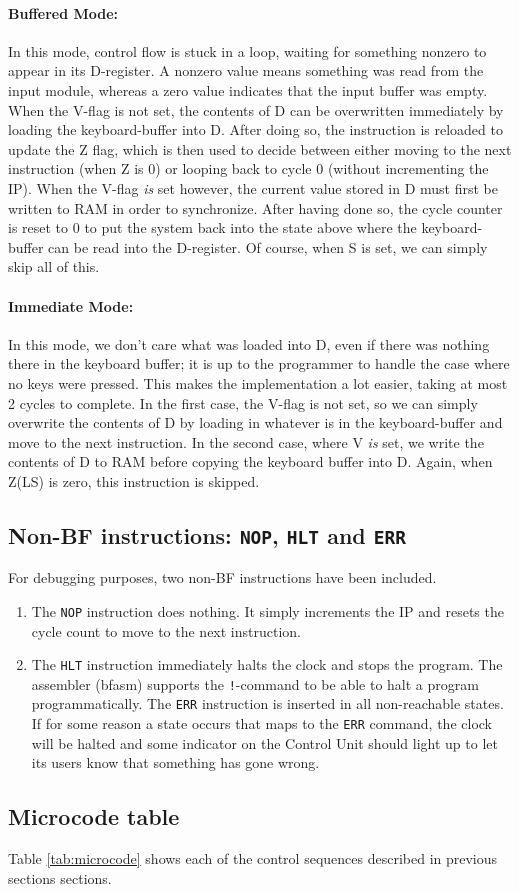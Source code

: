 \paragraph{Buffered Mode:}
In this mode, control flow is stuck in a loop, waiting for something nonzero to appear in its D-register. A nonzero value means something was read from the input module, whereas a zero value indicates that the input buffer was empty. When the V-flag is not set, the contents of D can be overwritten immediately by loading the keyboard-buffer into D. After doing so, the instruction is reloaded to update the Z flag, which is then used to decide between either moving to the next instruction (when Z is 0) or looping back to cycle 0 (without incrementing the IP). When the V-flag \emph{is} set however, the current value stored in D must first be written to RAM in order to synchronize.  After having done so, the cycle counter is reset to 0 to put the system back into the state above where the keyboard-buffer can be read into the D-register. Of course, when S is set, we can simply skip all of this.

\paragraph{Immediate Mode:}
In this mode, we don't care what was loaded into D, even if there was nothing there in the keyboard buffer; it is up to the programmer to handle the case where no keys were pressed. This makes the implementation a lot easier, taking at most 2 cycles to complete. In the first case, the V-flag is not set, so we can simply overwrite the contents of D by loading in whatever is in the keyboard-buffer and move to the next instruction. In the second case, where V \emph{is} set, we write the contents of D to RAM before copying the keyboard buffer into D. Again, when Z(LS) is zero, this instruction is skipped.
  
\subsection{Non-BF instructions: \texttt{NOP}, \texttt{HLT} and \texttt{ERR}}
For debugging purposes, two non-BF instructions have been included.
\begin{enumerate}
\item  The \texttt{NOP} instruction does nothing. It simply increments the IP and resets the cycle count to move to the next instruction.
\item The \texttt{HLT} instruction immediately halts the clock and stops the program. The assembler (bfasm) supports the \texttt{!}-command to be able to halt a program programmatically.
  The \texttt{ERR} instruction is inserted in all non-reachable states. If for some reason a state occurs that maps to the \texttt{ERR} command, the clock will be halted and some indicator on the Control Unit should light up to let its users know that something has gone wrong.
\end{enumerate}

\subsection{Microcode table}
Table \ref{tab:microcode} shows each of the control sequences described in previous sections sections.





